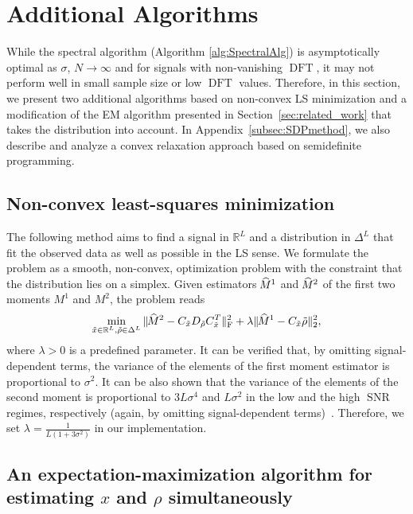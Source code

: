 \documentclass{IEEEtran}
\numberwithin{equation}{section}
\numberwithin{figure}{section}
\theoremstyle{plain}
\theoremstyle{definition}
\theoremstyle{remark}
\theoremstyle{plain}
\theoremstyle{remark}
\theoremstyle{plain}
\theoremstyle{plain}
\theoremstyle{remark}
\newcommand{\RL}{\mathbb{R}^L}
\newcommand{\DFT}{\operatorname{DFT}}
\newcommand{\SNR}{\operatorname{SNR}}
\newcommand{\hatM}{\widehat{\hspace{-1pt}M}\phantom{\hspace{-11pt}M}}
\begin{document}

\section{Additional Algorithms} \label{sec:algorithms}

While the spectral algorithm (Algorithm \ref{alg:SpectralAlg}) is asymptotically optimal as $\sigma$, $N \to \infty$ and for signals with non-vanishing $\DFT$, it may not perform well in small sample size or low $\DFT$ values. Therefore, in this section, we present two additional algorithms based on non-convex LS minimization and a modification of the EM algorithm presented in Section~\ref{sec:related_work} that takes the distribution into account. In Appendix~\ref{subsec:SDPmethod}, we also describe and analyze a convex relaxation approach based on semidefinite programming.

\subsection{Non-convex least-squares minimization} \label{subsec:LS_method}
 
The following method aims to find a signal in $\RL$ and a distribution in $\Delta^L$ that fit the observed data as well as possible in the LS sense. We formulate the problem
 as a smooth, non-convex, optimization problem with the constraint that the distribution lies on a simplex. Given estimators $\hatM^1$ and $\hatM^2$ of the first two moments $M^1$ and $M^2$, the problem reads
%
\begin{equation} \label{eq:LS}
%
    \min_{\tilde x\in\RL,\tilde \rho\in\Delta^L} 
        \| \hatM^2 - C_{\tilde x}D_{\tilde\rho} C_{\tilde x}^T\|_{\textrm{F}}^2 
        + \lambda\| \hatM^1 - C_{\tilde x}\tilde \rho\|_2^2,
%
\end{equation}
%
where $\lambda > 0$ is a predefined parameter. It can be verified that, by omitting signal-dependent terms, the variance of the elements of the first moment estimator is proportional to $\sigma^2$. It can be also shown that the variance of the elements of the second moment is proportional to $3L\sigma^4$ and $L\sigma^2$ in the low and the high $\SNR$ regimes, respectively (again, by omitting signal-dependent terms)~\cite{boumal2018heterogeneous}. Therefore, we set $\lambda =\frac{1}{L(1+3\sigma^2)}$ in our implementation.

 \subsection{An expectation-maximization algorithm for estimating $x$ and $\rho$ simultaneously} \label{sec:NU_EM}
\end{document}
